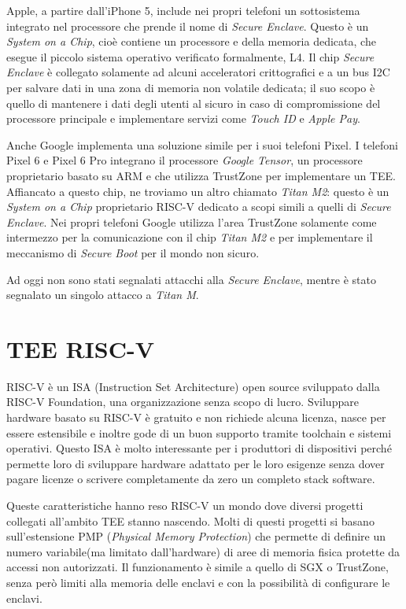 \documentclass[12pt,italian]{report}
\begin{document}
\bigbreak \noindent

Apple, a partire dall'iPhone 5, include nei propri telefoni un sottosistema
integrato nel processore che prende il nome di
\textit{Secure Enclave}.
Questo è un \textit{System on a Chip}, cioè contiene un processore
e della memoria dedicata, che esegue il piccolo sistema operativo verificato
formalmente, L4\cite{secure_enclave}.
Il chip \textit{Secure Enclave} è collegato solamente ad alcuni
acceleratori crittografici e a un bus I2C per salvare dati in una zona di
memoria non volatile dedicata; il suo scopo è quello di mantenere i dati
degli utenti al sicuro in caso di compromissione del processore principale
e implementare servizi come \textit{Touch ID} e \textit{Apple Pay}.

\bigbreak \noindent
Anche Google implementa una soluzione simile per i suoi telefoni Pixel.
I telefoni Pixel 6 e Pixel 6 Pro integrano il processore
\textit{Google Tensor}, un processore proprietario basato su ARM e che
utilizza TrustZone per implementare un TEE.
Affiancato a questo chip, ne troviamo un altro chiamato \textit{Titan M2}:
questo è un \textit{System on a Chip} proprietario RISC-V dedicato a
scopi simili a quelli di \textit{Secure Enclave}.   
Nei propri telefoni Google utilizza l'area TrustZone solamente come
intermezzo per la comunicazione con il chip \textit{Titan M2} e per
implementare il meccanismo di \textit{Secure Boot} per il mondo
non sicuro.

\bigbreak \noindent

Ad oggi non sono stati segnalati attacchi alla \textit{Secure Enclave},
mentre è stato segnalato un singolo attacco\cite{attack_titanM} a
\textit{Titan M}.

\section{TEE RISC-V}
\label{sec:risc-v}
RISC-V è un ISA (Instruction Set Architecture) open source sviluppato
dalla RISC-V Foundation, una organizzazione senza scopo di lucro.
Sviluppare hardware basato su RISC-V è gratuito e non richiede alcuna
licenza, nasce per essere estensibile e inoltre gode di un buon supporto
tramite toolchain e sistemi operativi.
Questo ISA è molto interessante per i produttori di dispositivi perché
permette loro di sviluppare hardware adattato per le loro esigenze
senza dover pagare licenze o scrivere completamente da zero un
completo stack software.

Queste caratteristiche hanno reso RISC-V un mondo dove diversi progetti
collegati all'ambito TEE stanno nascendo.
Molti di questi progetti si basano sull'estensione
PMP (\textit{Physical Memory Protection}) che permette di definire un
numero variabile(ma limitato dall'hardware) di aree di memoria fisica
protette da accessi non autorizzati.
Il funzionamento è simile a quello di SGX o TrustZone, senza però limiti
alla memoria delle enclavi e con la possibilità di configurare le enclavi.
\end{document}
